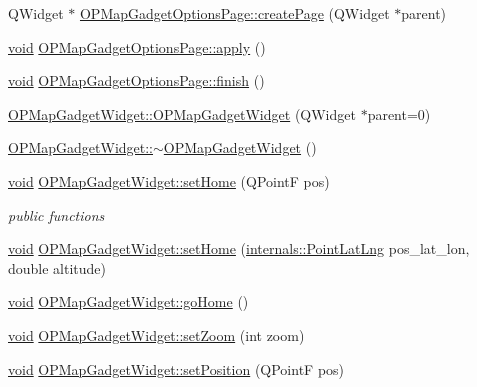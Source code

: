 \begin{DoxyCompactItemize}
\-Q\-Widget $\ast$ \hyperlink{group___o_p_map_plugin_gaec7ef2751680eb7ff0f4f6abdf2fd4c4}{\-O\-P\-Map\-Gadget\-Options\-Page\-::create\-Page} (\-Q\-Widget $\ast$parent)
\item 
\hyperlink{group___u_a_v_objects_plugin_ga444cf2ff3f0ecbe028adce838d373f5c}{void} \hyperlink{group___o_p_map_plugin_ga8b2ec9377a2fb5a144b5c5aab349225f}{\-O\-P\-Map\-Gadget\-Options\-Page\-::apply} ()
\item 
\hyperlink{group___u_a_v_objects_plugin_ga444cf2ff3f0ecbe028adce838d373f5c}{void} \hyperlink{group___o_p_map_plugin_ga7d645e14473ae14e762cc694e85e28a8}{\-O\-P\-Map\-Gadget\-Options\-Page\-::finish} ()
\item 
\hyperlink{group___o_p_map_plugin_ga7fe62a2d1a8b920f3e44900dee8d9d5a}{\-O\-P\-Map\-Gadget\-Widget\-::\-O\-P\-Map\-Gadget\-Widget} (\-Q\-Widget $\ast$parent=0)
\item 
\hyperlink{group___o_p_map_plugin_ga7c7775d0011bd9d0f8ca0219f48bc193}{\-O\-P\-Map\-Gadget\-Widget\-::$\sim$\-O\-P\-Map\-Gadget\-Widget} ()
\item 
\hyperlink{group___u_a_v_objects_plugin_ga444cf2ff3f0ecbe028adce838d373f5c}{void} \hyperlink{group___o_p_map_plugin_gaea4b659a9476e351373fc6df96026327}{\-O\-P\-Map\-Gadget\-Widget\-::set\-Home} (\-Q\-Point\-F pos)
\begin{DoxyCompactList}\small\item\em public functions \end{DoxyCompactList}\item 
\hyperlink{group___u_a_v_objects_plugin_ga444cf2ff3f0ecbe028adce838d373f5c}{void} \hyperlink{group___o_p_map_plugin_ga7eaa4b0e19be1df614f49d7b86393a19}{\-O\-P\-Map\-Gadget\-Widget\-::set\-Home} (\hyperlink{structinternals_1_1_point_lat_lng}{internals\-::\-Point\-Lat\-Lng} pos\-\_\-lat\-\_\-lon, double altitude)
\item 
\hyperlink{group___u_a_v_objects_plugin_ga444cf2ff3f0ecbe028adce838d373f5c}{void} \hyperlink{group___o_p_map_plugin_gab81157189920148cb4178548aeef4b92}{\-O\-P\-Map\-Gadget\-Widget\-::go\-Home} ()
\item 
\hyperlink{group___u_a_v_objects_plugin_ga444cf2ff3f0ecbe028adce838d373f5c}{void} \hyperlink{group___o_p_map_plugin_gaa2731b7fb965c417860b30ac354437ca}{\-O\-P\-Map\-Gadget\-Widget\-::set\-Zoom} (int zoom)
\item 
\hyperlink{group___u_a_v_objects_plugin_ga444cf2ff3f0ecbe028adce838d373f5c}{void} \hyperlink{group___o_p_map_plugin_ga4c9793fea42fd12ba9f7f27c25f98523}{\-O\-P\-Map\-Gadget\-Widget\-::set\-Position} (\-Q\-Point\-F pos)

\end{DoxyCompactItemize}
